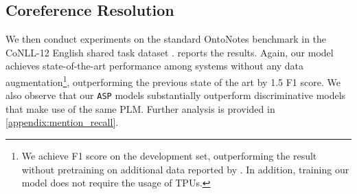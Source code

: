 \documentclass[11pt]{article}
\newcommand*{\asp}{\texttt{ASP}}
\begin{document}
\begin{table}[ht]
\centering
{} 
\caption{Test F1 scores of entity and relation extraction on the ACE-05 joint entity relation extraction task.}
\label{tab:result_test_ere_ace05}
\end{table}
 
\subsection{Coreference Resolution}
We then conduct experiments on the standard OntoNotes benchmark in the CoNLL-12 English shared task dataset \cite{pradhan-etal-2012-conll}.
 reports the results. Again, our model achieves state-of-the-art performance among systems without any data augmentation\footnote{We achieve  F1 score on the development set, outperforming the result without pretraining on additional data reported by \citet[Tab. 5]{wu-etal-2020-corefqa}. 
In addition, training our model does not require the usage of TPUs.}, outperforming the previous state of the art by 1.5 F1 score.
We also observe that our \asp{} models substantially outperform discriminative models that make use of the same PLM.
Further analysis is provided in \cref{appendix:mention_recall}.
\end{document}
